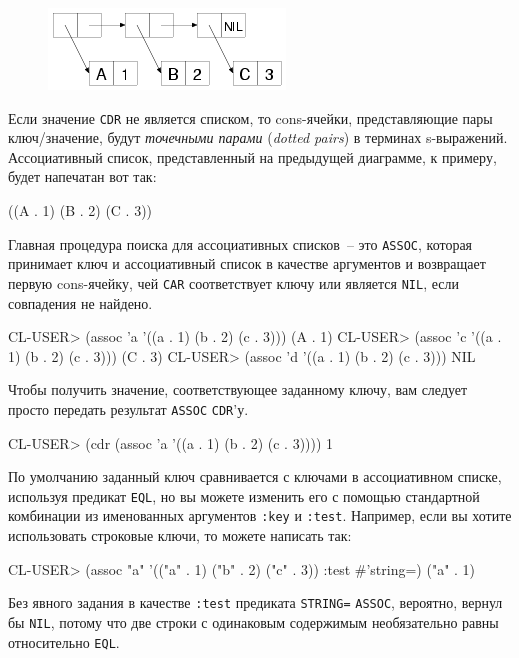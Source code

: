 \begin{figure}[h]
  \centering
  \includegraphics[scale=0.6]{images/alist-abc-123.png}
\end{figure}

Если значение \lstinline{CDR} не является списком, то cons-ячейки, представляющие пары ключ/значение,
будут \textit{точечными парами} (\textit{dotted pairs}) в терминах s-выражений. Ассоциативный
список, представленный на предыдущей диаграмме, к примеру, будет напечатан вот так:

\begin{myverb}
((A . 1) (B . 2) (C . 3))
\end{myverb}

Главная процедура поиска для ассоциативных списков~-- это \lstinline{ASSOC}, которая принимает
ключ и ассоциативный список в качестве аргументов и возвращает первую cons-ячейку, чей
\lstinline{CAR} соответствует ключу или является \lstinline{NIL}, если совпадения не найдено.
  
\begin{myverb}
CL-USER> (assoc 'a '((a . 1) (b . 2) (c . 3)))
(A . 1)
CL-USER> (assoc 'c '((a . 1) (b . 2) (c . 3)))
(C . 3)
CL-USER> (assoc 'd '((a . 1) (b . 2) (c . 3)))
NIL
\end{myverb}

Чтобы получить значение, соответствующее заданному ключу, вам следует просто передать
результат \lstinline{ASSOC} \lstinline{СDR}'у.
  
\begin{myverb}
CL-USER> (cdr (assoc 'a '((a . 1) (b . 2) (c . 3))))
1
\end{myverb}

По умолчанию заданный ключ сравнивается с ключами в ассоциативном списке, используя
предикат \lstinline{EQL}, но вы можете изменить его с помощью стандартной комбинации из
именованных аргументов \lstinline{:key} и \lstinline{:test}. Например, если вы хотите использовать
строковые ключи, то можете написать так:
  
\begin{myverb}
CL-USER> (assoc "a" '(("a" . 1) ("b" . 2) ("c" . 3)) :test #'string=)
("a" . 1)
\end{myverb}

Без явного задания в качестве \lstinline{:test} предиката \lstinline{STRING=} \lstinline{ASSOC}, вероятно,
вернул бы \lstinline{NIL}, потому что две строки с одинаковым содержимым необязательно равны
относительно \lstinline{EQL}.

